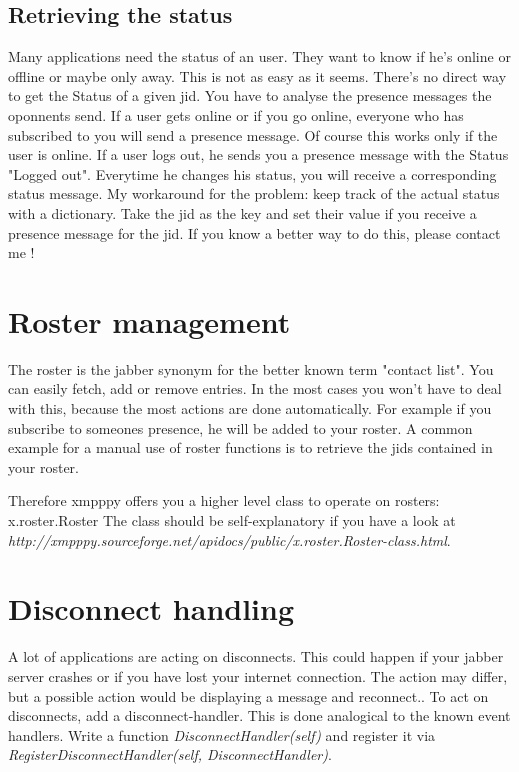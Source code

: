 \subsection{Retrieving the status}


Many applications need the status of an user. They want to know if he's online or offline or maybe only away.
This is not as easy as it seems. There's no direct way to get the Status of a given jid. You have to analyse the presence messages the oponnents send. If a user gets online or if you go online, everyone who has subscribed to you will send a presence message. Of course this works only if the user is online.
If a user logs out, he sends you a presence message with the Status "Logged out". Everytime he changes his status, you will receive a corresponding status message.
My workaround for the problem: keep track of the actual status with a dictionary. Take the jid as the key
and set their value if you receive a presence message for the jid.
\newline
\newline
If you know a better way to do this, please contact me !


\section{Roster management}
The roster is the jabber synonym for the better known term "contact list". You can easily fetch, add or remove entries.
In the most cases you won't have to deal with this, because the most actions are done automatically.
For example if you subscribe to someones presence, he will be added to your roster.
A common example for a manual use of roster functions is to retrieve the jids contained in your roster.

Therefore xmpppy offers you a higher level class to operate on rosters: x.roster.Roster
\newline
The class should be self-explanatory if you have a look at
\newline \textit{http://xmpppy.sourceforge.net/apidocs/public/x.roster.Roster-class.html}.

\section{Disconnect handling}

A lot of applications are acting on disconnects. This could happen if your jabber server crashes or if you have lost your internet connection. The action may differ, but a possible action would be displaying a message and reconnect..
To act on disconnects, add a disconnect-handler. This is done analogical to the known event handlers.
Write a function \textit{DisconnectHandler(self)} and register it via \textit{RegisterDisconnectHandler(self, DisconnectHandler)}.






